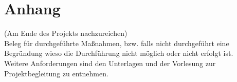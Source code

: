 \documentclass[accentcolor=tud0b,12pt,paper=a4]{tudreport}
\begin{document}
\appendix	
	\chapter{Anhang}
		(Am Ende des Projekts nachzureichen)\\
		Beleg für durchgeführte Maßnahmen, bzw. falls nicht durchgeführt eine Begründung wieso die Durchführung nicht möglich oder nicht erfolgt ist. \\
		Weitere Anforderungen sind den Unterlagen und der Vorlesung zur Projektbegleitung zu entnehmen.
	
\end{document}
